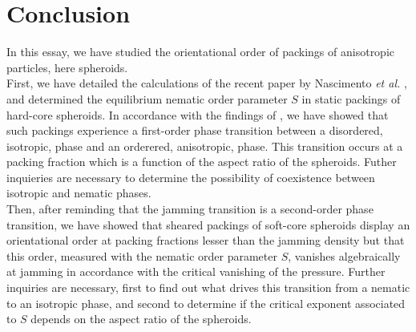 \documentclass[class=report, float=false, crop=false]{standalone}
\begin{document}
\section*{Conclusion}
\label{conclusion}

In this essay, we have studied the orientational order of packings of anisotropic particles, here spheroids.\\

First, we have detailed the calculations of the recent paper by Nascimento \textit{et al.} \cite{nascimento2017density}, and determined the equilibrium nematic order parameter $S$ in static packings of hard-core spheroids. In accordance with the findings of \cite{nascimento2017density}, we have showed that such packings experience a first-order phase transition between a disordered, isotropic, phase and an orderered, anisotropic, phase. This transition occurs at a packing fraction which is a function of the aspect ratio of the spheroids. Futher inquieries are necessary to determine the possibility of coexistence between isotropic and nematic phases.\\

Then, after reminding that the jamming transition is a second-order phase transition, we have showed that sheared packings of soft-core spheroids display an orientational order at packing fractions lesser than the jamming density but that this order, measured with the nematic order parameter $S$, vanishes algebraically at jamming in accordance with the critical vanishing of the pressure. Further inquiries are necessary, first to find out what drives this transition from a nematic to an isotropic phase, and second to determine if the critical exponent associated to $S$ depends on the aspect ratio of the spheroids.

% 
\end{document}
